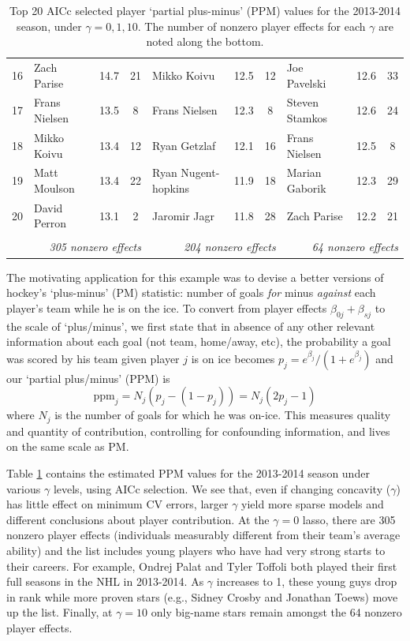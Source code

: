 \documentclass[12pt]{article}
\newcommand{\mr}[1]{\mathrm{#1}}
\begin{document}
\begin{table}[tb]
{\begin{tabular}{l|lcc|lcc|lcc|}
16 & Zach Parise & 14.7 & 21 & Mikko Koivu & 12.5 & 12 & Joe Pavelski & 12.6 & 33 \\
17 & Frans Nielsen & 13.5 & 8 & Frans Nielsen & 12.3 & 8 & Steven Stamkos & 12.6 & 24 \\
18 & Mikko Koivu & 13.4 & 12 & Ryan Getzlaf & 12.1 & 16 & Frans Nielsen & 12.5 & 8 \\
19 & Matt Moulson & 13.4 & 22 & Ryan Nugent-hopkins & 11.9 & 18 & Marian Gaborik & 12.3 & 29 \\
20 & David Perron & 13.1 & 2 & Jaromir Jagr & 11.8 & 28 & Zach Parise & 12.2 & 21 \\
\multicolumn{1}{c}{} & \multicolumn{3}{r|}{} & \multicolumn{3}{r|}{} &  \multicolumn{3}{r|}{}\\
 \multicolumn{1}{c}{} & \multicolumn{3}{r|}{\it 305 nonzero effects} & \multicolumn{3}{r|}{\it 204 nonzero effects} &  \multicolumn{3}{r|}{\it 64 nonzero effects}
\end{tabular}}
\caption{\label{nhleffects} Top 20 AICc selected player `partial plus-minus' (PPM) values for the 2013-2014 season, under $\gamma = 0,1,10$.  The number of nonzero player effects for each $\gamma$ are noted along the bottom.}
\end{table}

The motivating application for this example was to devise a better versions of
hockey's `plus-minus' (PM) statistic: number of goals {\it for} minus {\it
against} each player's team while he is on the ice. To convert from player
effects $\beta_{0j} + \beta_{sj}$ to the scale of `plus/minus', we first state
that in absence of any other relevant information about each goal (not team,
home/away, etc), the probability a goal was scored by his team given player
$j$ is on ice becomes $p_j = e^{\beta_j}/(1+e^{\beta_j})$ and our `partial
plus/minus' (PPM) is \[ \mr{ppm}_j = N_j(p_j - (1-p_j)) = N_j(2p_j-1) \] where
$N_j$ is the  number of goals for which he was on-ice.  This measures 
quality and quantity of contribution, controlling for
confounding information, and lives on the same scale as PM.

Table \ref{nhleffects} contains the estimated PPM values for the 2013-2014
season under various $\gamma$ levels, using AICc selection.  We see that, even
if changing concavity ($\gamma$) has little effect on minimum CV errors,
larger $\gamma$  yield more sparse models and different conclusions about
player contribution. At the $\gamma=0$ lasso, there are 305 nonzero player
effects (individuals measurably different from their team's average ability)
and the list includes young players who have had very strong starts to their
careers.  For example, Ondrej Palat and Tyler Toffoli both played their first
full seasons in the NHL in 2013-2014.  As $\gamma$ increases to 1, these young
guys  drop in rank while more proven stars (e.g., Sidney Crosby and Jonathan
Toews) move up the list.  Finally, at $\gamma=10$ only big-name stars remain
amongst the 64 nonzero player effects.
\end{document}
